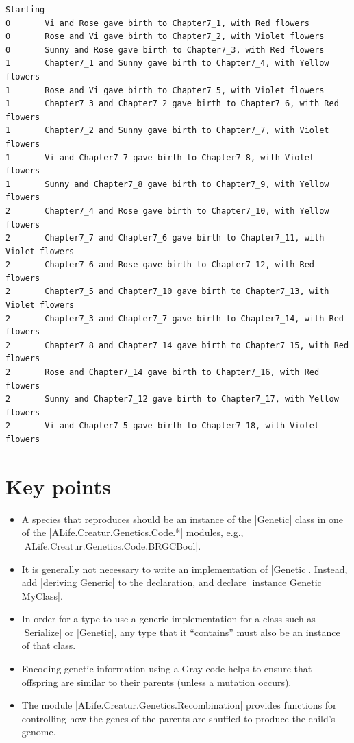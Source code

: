 \documentclass[a4paper,10pt]{report}
\begin{document}
\begin{verbatim}
Starting
0       Vi and Rose gave birth to Chapter7_1, with Red flowers
0       Rose and Vi gave birth to Chapter7_2, with Violet flowers
0       Sunny and Rose gave birth to Chapter7_3, with Red flowers
1       Chapter7_1 and Sunny gave birth to Chapter7_4, with Yellow flowers
1       Rose and Vi gave birth to Chapter7_5, with Violet flowers
1       Chapter7_3 and Chapter7_2 gave birth to Chapter7_6, with Red flowers
1       Chapter7_2 and Sunny gave birth to Chapter7_7, with Violet flowers
1       Vi and Chapter7_7 gave birth to Chapter7_8, with Violet flowers
1       Sunny and Chapter7_8 gave birth to Chapter7_9, with Yellow flowers
2       Chapter7_4 and Rose gave birth to Chapter7_10, with Yellow flowers
2       Chapter7_7 and Chapter7_6 gave birth to Chapter7_11, with Violet flowers
2       Chapter7_6 and Rose gave birth to Chapter7_12, with Red flowers
2       Chapter7_5 and Chapter7_10 gave birth to Chapter7_13, with Violet flowers
2       Chapter7_3 and Chapter7_7 gave birth to Chapter7_14, with Red flowers
2       Chapter7_8 and Chapter7_14 gave birth to Chapter7_15, with Red flowers
2       Rose and Chapter7_14 gave birth to Chapter7_16, with Red flowers
2       Sunny and Chapter7_12 gave birth to Chapter7_17, with Yellow flowers
2       Vi and Chapter7_5 gave birth to Chapter7_18, with Violet flowers
\end{verbatim}

\section{Key points}

\begin{itemize}
\item A species that reproduces should be an instance of the |Genetic| class in
one of the |ALife.Creatur.Genetics.Code.*| modules,
e.g., |ALife.Creatur.Genetics.Code.BRGCBool|.
\item It is generally not necessary to write an implementation of |Genetic|.
Instead, add |deriving Generic| to the declaration,
and declare |instance Genetic MyClass|.
\item In order for a type to use a generic implementation for a class such as
|Serialize| or |Genetic|, any type that it ``contains'' must also be an instance of that class.
\item Encoding genetic information using a Gray code helps to ensure that offspring
are similar to their parents (unless a mutation occurs).
\item The module |ALife.Creatur.Genetics.Recombination| provides functions
for controlling how the genes of the parents are shuffled to produce the child's genome.
\end{itemize}
\end{document}
